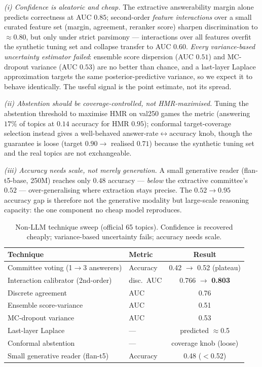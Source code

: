 \documentclass[11pt,a4paper]{article}
\begin{document}
\emph{(i) Confidence is aleatoric and cheap.} The extractive answerability margin
alone predicts correctness at AUC $0.85$; second-order \emph{feature interactions}
over a small curated feature set (margin, agreement, reranker score) sharpen
discrimination to $\approx0.80$, but only under strict parsimony --- interactions
over all features overfit the synthetic tuning set and collapse transfer to AUC
$0.60$. \emph{Every variance-based uncertainty estimator failed}: ensemble score
dispersion (AUC $0.51$) and MC-dropout variance (AUC $0.53$) are no better than
chance, and a last-layer Laplace approximation targets the same posterior-predictive
variance, so we expect it to behave identically. The useful signal is the point
estimate, not its spread.

\emph{(ii) Abstention should be coverage-controlled, not HMR-maximised.} Tuning the
abstention threshold to maximise HMR on val250 games the metric (answering $17\%$ of
topics at $0.14$ accuracy for HMR $0.95$); conformal target-coverage selection
instead gives a well-behaved answer-rate$\leftrightarrow$accuracy knob, though the
guarantee is loose (target $0.90 \to$ realised $0.71$) because the synthetic tuning
set and the real topics are not exchangeable.

\emph{(iii) Accuracy needs scale, not merely generation.} A small generative reader
(flan-t5-base, 250M) reaches only $0.48$ accuracy --- \emph{below} the extractive
committee's $0.52$ --- over-generalising where extraction stays precise. The
$0.52\!\to\!0.95$ accuracy gap is therefore not the generative modality but
large-scale reasoning capacity: the one component no cheap model reproduces.

\begin{table}[t]
\centering\small
\caption{Non-LLM technique sweep (official 65 topics). Confidence is recovered
cheaply; variance-based uncertainty fails; accuracy needs scale.}
\label{tab:sweep}
\begin{tabular}{llc}
\toprule
Technique & Metric & Result \\
\midrule
Committee voting (1$\to$3 answerers) & Accuracy & 0.42 $\to$ 0.52 (plateau) \\
Interaction calibrator (2nd-order) & disc.\ AUC & 0.766 $\to$ \textbf{0.803} \\
Discrete agreement & AUC & 0.76 \\
Ensemble score-variance & AUC & 0.51 \\
MC-dropout variance & AUC & 0.53 \\
Last-layer Laplace & --- & predicted $\approx$0.5 \\
Conformal abstention & --- & coverage knob (loose) \\
Small generative reader (flan-t5) & Accuracy & 0.48 ($<$0.52) \\
\bottomrule
\end{tabular}
\end{table}
\end{document}
